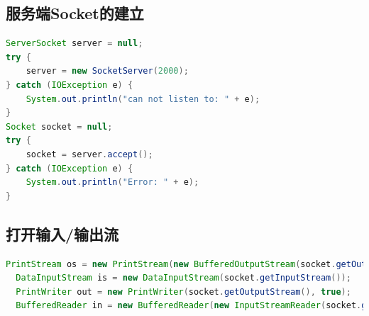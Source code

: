 \subsection{服务端Socket的建立}
\begin{lstlisting}[language=java]
ServerSocket server = null;
try {
	server = new SocketServer(2000);
} catch (IOException e) {
	System.out.println("can not listen to: " + e);
}
Socket socket = null;
try {
	socket = server.accept();
} catch (IOException e) {
	System.out.println("Error: " + e);
}
\end{lstlisting}
\subsection{打开输入/输出流}
\begin{lstlisting}[language=java]
  PrintStream os = new PrintStream(new BufferedOutputStream(socket.getOutputStream()));
  DataInputStream is = new DataInputStream(socket.getInputStream());
  PrintWriter out = new PrintWriter(socket.getOutputStream(), true);
  BufferedReader in = new BufferedReader(new InputStreamReader(socket.getInputStream()));
\end{lstlisting}
